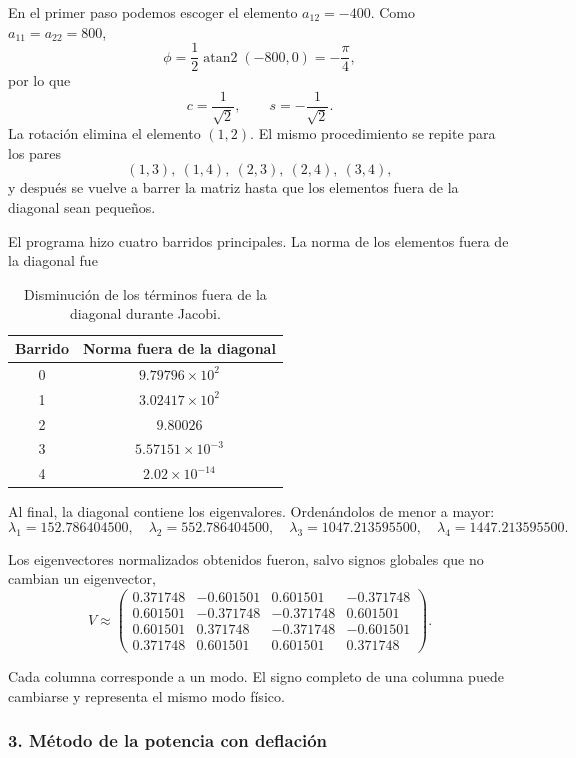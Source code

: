 \documentclass[11pt,a4paper]{article}
\begin{document}
En el primer paso podemos escoger el elemento $a_{12}=-400$. Como $a_{11}=a_{22}=800$,
\[
\phi=\frac12\operatorname{atan2}(-800,0)=-\frac\pi4,
\]
por lo que
\[
c=\frac{1}{\sqrt2},
\qquad
s=-\frac{1}{\sqrt2}.
\]
La rotación elimina el elemento $(1,2)$. El mismo procedimiento se repite para los pares
\[
(1,3),\ (1,4),\ (2,3),\ (2,4),\ (3,4),
\]
y después se vuelve a barrer la matriz hasta que los elementos fuera de la diagonal sean pequeños.

El programa hizo cuatro barridos principales. La norma de los elementos fuera de la diagonal fue
\begin{table}[H]
\centering
\caption{Disminución de los términos fuera de la diagonal durante Jacobi.}
\begin{tabular}{cc}
\toprule
Barrido & Norma fuera de la diagonal\\
\midrule
0&$9.79796\times10^2$\\
1&$3.02417\times10^2$\\
2&$9.80026$\\
3&$5.57151\times10^{-3}$\\
4&$2.02\times10^{-14}$\\
\bottomrule
\end{tabular}
\end{table}

Al final, la diagonal contiene los eigenvalores. Ordenándolos de menor a mayor:
\begin{equation}
\boxed{
\lambda_1=152.786404500,
\quad
\lambda_2=552.786404500,
\quad
\lambda_3=1047.213595500,
\quad
\lambda_4=1447.213595500.
}
\end{equation}

Los eigenvectores normalizados obtenidos fueron, salvo signos globales que no cambian un eigenvector,
\begin{equation}
V\approx
\begin{pmatrix}
0.371748&-0.601501&0.601501&-0.371748\\
0.601501&-0.371748&-0.371748&0.601501\\
0.601501&0.371748&-0.371748&-0.601501\\
0.371748&0.601501&0.601501&0.371748
\end{pmatrix}.
\end{equation}

Cada columna corresponde a un modo. El signo completo de una columna puede cambiarse y representa el mismo modo físico.

\subsubsection*{3. Método de la potencia con deflación}
\end{document}
